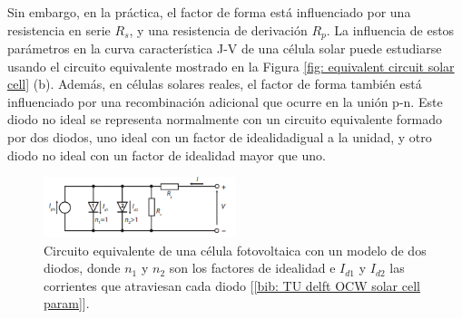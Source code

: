 \documentclass[12pt]{article}
\begin{document}
	\noindent Sin embargo, en la práctica, el factor de forma está influenciado por una resistencia en serie $R_{s}$, y una resistencia de derivación $R_{p}$. La influencia de estos parámetros en la curva característica J-V de una célula solar puede estudiarse usando el circuito equivalente mostrado en la Figura \ref{fig: equivalent circuit solar cell} (b). Además, en células solares reales, el factor de forma también está influenciado por una recombinación adicional que ocurre en la unión p-n. Este diodo no ideal se representa normalmente con un circuito equivalente formado por dos diodos, uno ideal con un factor de idealidad\footnotemark \enspace igual a la unidad, y otro diodo no ideal con un factor de idealidad mayor que uno. \\
	

	
	\begin{figure}[h!]
		\begin{center}
			\includegraphics[width=0.5\textwidth]{img/nonIdeal_equivCircuit_solarCell.png}
			\caption{Circuito equivalente de una célula fotovoltaica con un modelo de dos diodos, donde $n_{1}$ y $n_{2}$ son los factores de idealidad e $I_{d1}$ y $I_{d2}$ las corrientes que atraviesan cada diodo [\ref{bib: TU delft OCW solar cell param}].}
			\label{fig: non-Ideal equivalent circuit solar cell}
		\end{center}
	\end{figure}	
	
	
	
\end{document}
